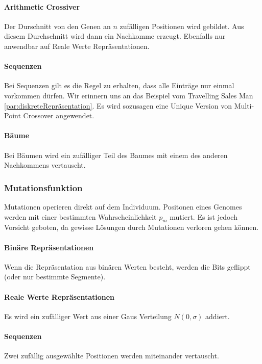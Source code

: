         \paragraph{Arithmetic Crossiver}
          Der Durschnitt von den Genen an \(n\) zufälligen Positionen wird gebildet.
          Aus diesem Durchschnitt wird dann ein Nachkomme erzeugt.
          Ebenfalls nur anwendbar auf Reale Werte Repräsentationen.

        \paragraph{Sequenzen}
          Bei Sequenzen gilt es die Regel zu erhalten, dass alle Einträge nur einmal vorkommen dürfen. Wir erinnern uns an das Beispiel vom Travelling Sales Man \ref{par:diskreteRepräsentation}.
          Es wird sozusagen eine Unique Version von  Multi-Point Crossover angewendet.

        \paragraph{Bäume}
          Bei Bäumen wird ein zufälliger Teil des Baumes mit einem des anderen Nachkommens vertauscht.

    \subsubsection{Mutationsfunktion}
      Mutationen operieren direkt auf dem Individuum. Positonen eines Genomes werden mit einer bestimmten Wahrscheinlichkeit \(p_{m}\) mutiert.
      Es ist jedoch Vorsicht geboten, da gewisse Lösungen durch Mutationen verloren gehen können.

      \paragraph{Binäre Repräsentationen}
        Wenn die Repräsentation aus binären Werten besteht, werden die Bits geflippt (oder nur bestimmte Segmente).

      \paragraph{Reale Werte Repräsentationen}
        Es wird ein zufälliger Wert aus einer Gaus Verteilung \(N(0,\sigma)\) addiert.

      \paragraph{Sequenzen}
        Zwei zufällig ausgewählte Positionen werden miteinander vertauscht.


